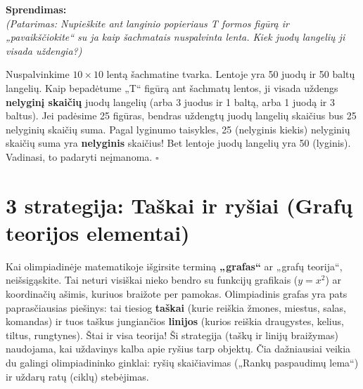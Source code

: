 \documentclass[11pt,a4paper]{scrartcl}
\newenvironment{solution}
    {\begin{list}{}{\setlength{\leftmargin}{10pt}\setlength{\rightmargin}{10pt}}\item[]}
    {\end{list}}
\begin{document}
\begin{minipage}{0.6\textwidth}
\begin{solution}
\textbf{Sprendimas:}\\
\textit{(Patarimas: Nupieškite ant langinio popieriaus T formos figūrą ir „pavaikščiokite“ su ja kaip šachmatais nuspalvinta lenta. Kiek juodų langelių ji visada uždengia?)}

Nuspalvinkime $10 \times 10$ lentą šachmatine tvarka. Lentoje yra 50 juodų ir 50 baltų langelių. 
Kaip bepadėtume „T“ figūrą ant šachmatų lentos, ji visada uždengs \textbf{nelyginį skaičių} juodų langelių (arba 3 juodus ir 1 baltą, arba 1 juodą ir 3 baltus).
Jei padėsime 25 figūras, bendras uždengtų juodų langelių skaičius bus 25 nelyginių skaičių suma. Pagal lyginumo taisykles, 25 (nelyginis kiekis) nelyginių skaičių suma yra \textbf{nelyginis} skaičius! Bet lentoje juodų langelių yra 50 (lyginis). Vadinasi, to padaryti neįmanoma. \hfill $\square$
\end{solution}
\end{minipage}
\hfill
\begin{minipage}{0.35\textwidth}
\centering
{}
\end{minipage}


\section{3 strategija: Taškai ir ryšiai (Grafų teorijos elementai)}

Kai olimpiadinėje matematikoje išgirsite terminą \textbf{„grafas“} ar „grafų teorija“, neišsigąskite. Tai neturi visiškai nieko bendro su funkcijų grafikais ($y = x^2$) ar koordinačių ašimis, kuriuos braižote per pamokas. 
Olimpiadinis grafas yra pats paprasčiausias piešinys: tai tiesiog \textbf{taškai} (kurie reiškia žmones, miestus, salas, komandas) ir tuos taškus jungiančios \textbf{linijos} (kurios reiškia draugystes, kelius, tiltus, rungtynes). Štai ir visa teorija!
Ši strategija (taškų ir linijų braižymas) naudojama, kai uždavinys kalba apie ryšius tarp objektų. Čia dažniausiai veikia du galingi olimpiadininko ginklai: ryšių skaičiavimas („Rankų paspaudimų lema“) ir uždarų ratų (ciklų) stebėjimas. 
\end{document}
